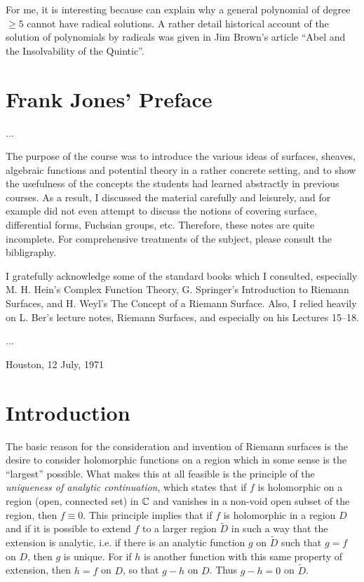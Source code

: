 \documentclass[a4paper,11pt]{article}
\begin{document}
For me, it is interesting because can explain why a general polynomial
of degree $\ge 5$ cannot have radical solutions.  A rather detail
historical account of the solution of polynomials by radicals was
given in Jim Brown's article ``Abel and the Insolvability of the
Quintic''.



\section{Frank Jones' Preface}

...

The purpose of the course was to introduce the various ideas of
surfaces, sheaves, algebraic functions and potential theory in a
rather concrete setting, and to show the usefulness of the concepts
the students had learned abstractly in previous courses.  As a result,
I discussed the material carefully and leisurely, and for example did
not even attempt to discuss the notions of covering surface,
differential forms, Fuchsian groups, etc.  Therefore, these notes are
quite incomplete.  For comprehensive treatments of the subject, please
consult the bibligraphy.

I gratefully acknowledge some of the standard books which I consulted,
especially M. H. Hein's Complex Function Theory, G. Springer's
Introduction to Riemann Surfaces, and H. Weyl's The Concept of a
Riemann Surface.  Also, I relied heavily on L. Ber's lecture notes,
Riemann Surfaces, and especially on his Lectures 15--18.

...

Houston, 12 July, 1971

\section{Introduction}

The basic reason for the consideration and invention of Riemann
surfaces is the desire to consider holomorphic functions on a region
which in some sense is the ``largest'' possible. What makes this at
all feasible is the principle of the \emph{uniqueness of analytic
  continuation}, which states that if $f$ is holomorphic on a region
(open, connected set) in ${\mathbb C}$ and vanishes in a non-void open subset
of the region, then $f\equiv 0$.  This principle implies that if $f$
is holomorphic in a region $D$ and if it is possible to extend $f$ to
a larger region $\widetilde{D}$ in such a way that the extension is
analytic, i.e. if there is an analytic function $g$ on $\widetilde{D}$
such that $g=f$ on $D$, then $g$ is unique.  For if $h$ is another
function with this same property of extension, then $h=f$ on $D$, so
that $g-h$ on $D$.  Thus $g-h=0$ on $\widetilde{D}$.
\end{document}
